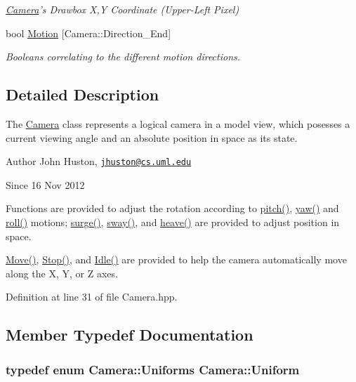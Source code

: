 \begin{DoxyCompactItemize}
\begin{DoxyCompactList}\small\item\em \hyperlink{class_camera}{Camera}'s Drawbox X,Y Coordinate (Upper-\/\-Left Pixel) \end{DoxyCompactList}\item 
bool \hyperlink{class_camera_a16f01b362cb7c18d203e468bf5483749}{Motion} \mbox{[}Camera\-::\-Direction\-\_\-\-End\mbox{]}
\begin{DoxyCompactList}\small\item\em Booleans correlating to the different motion directions. \end{DoxyCompactList}\end{DoxyCompactItemize}


\subsection{Detailed Description}
The \hyperlink{class_camera}{Camera} class represents a logical camera in a model view, which posesses a current viewing angle and an absolute position in space as its state. 

\begin{DoxyAuthor}{Author}
John Huston, \href{mailto:jhuston@cs.uml.edu}{\tt jhuston@cs.\-uml.\-edu} 
\end{DoxyAuthor}
\begin{DoxySince}{Since}
16 Nov 2012
\end{DoxySince}
Functions are provided to adjust the rotation according to \hyperlink{class_camera_aac7dbb6201be7f17e014fc6fdf915560}{pitch()}, \hyperlink{class_camera_a0ce7d12edbe47d9a8915d8af98d8f524}{yaw()} and \hyperlink{class_camera_a1ba0979fe0b2ec58085d5f9721858e5e}{roll()} motions; \hyperlink{class_camera_abb2251df65445bf8efd3fe0074fb5033}{surge()}, \hyperlink{class_camera_abbe6fe82ed05e64e35b0c4ed2001b34e}{sway()}, and \hyperlink{class_camera_a2148d751f104d8e39c9832e2372df2d9}{heave()} are provided to adjust position in space.

\hyperlink{class_camera_a421e03f93824e178d6e77ff547cd290e}{Move()}, \hyperlink{class_camera_adf064f765f610684e0675bd67de013fd}{Stop()}, and \hyperlink{class_camera_aec3559fe43597656629fdb00157d3c73}{Idle()} are provided to help the camera automatically move along the X, Y, or Z axes. 

Definition at line 31 of file Camera.\-hpp.



\subsection{Member Typedef Documentation}
\hypertarget{class_camera_a0ed19c96505cbb70625938d1e883af24}{
\subsubsection[{Uniform}]{\setlength{\rightskip}{0pt plus 5cm}typedef enum {\bf Camera\-::\-Uniforms}  {\bf Camera\-::\-Uniform}}}\label{class_camera_a0ed19c96505cbb70625938d1e883af24}


